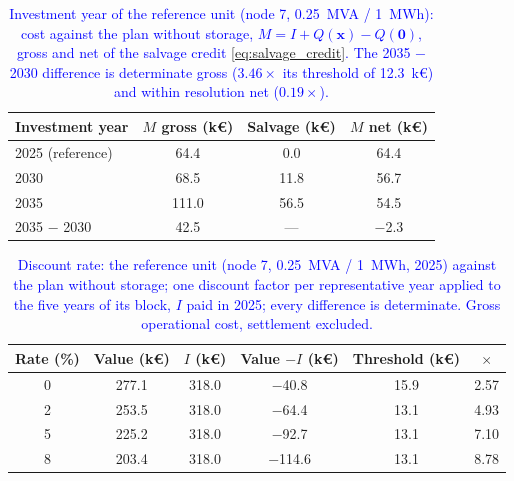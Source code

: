 \begin{table}[htbp!]
    \centering
    \caption{\textcolor{blue}{Investment year of the reference unit (node 7, 0.25~MVA / 1~MWh): cost against the plan without storage, $M = I + Q(\boldsymbol{x}) - Q(\boldsymbol{0})$, gross and net of the salvage credit \eqref{eq:salvage_credit}. The 2035 $-$ 2030 difference is determinate gross ($3.46\times$ its threshold of 12.3~k\euro) and within resolution net ($0.19\times$).}}
    \label{tab:res_year_ladder}
    \scriptsize\setlength{\tabcolsep}{5pt}
    \begin{tabular}{l c c c}
        \toprule
        Investment year & $M$ gross (k\euro) & Salvage (k\euro) & $M$ net (k\euro) \\
        \midrule
        2025 (reference) & 64.4  & 0.0  & 64.4 \\
        2030             & 68.5  & 11.8 & 56.7 \\
        2035             & 111.0 & 56.5 & 54.5 \\
        2035 $-$ 2030    & 42.5  & ---  & $-$2.3 \\
        \bottomrule
    \end{tabular}
\end{table}

\begin{table}[htbp!]
    \centering
    \caption{\textcolor{blue}{Discount rate: the reference unit (node 7, 0.25~MVA / 1~MWh, 2025) against the plan without storage; one discount factor per representative year applied to the five years of its block, $I$ paid in 2025; every difference is determinate. Gross operational cost, settlement excluded.}}
    \label{tab:res_discount}
    \scriptsize\setlength{\tabcolsep}{5pt}
    \begin{tabular}{c c c c c c}
        \toprule
        Rate (\%) & Value (k\euro) & $I$ (k\euro) & Value $- I$ (k\euro) & Threshold (k\euro) & $\times$ \\
        \midrule
        0 & 277.1 & 318.0 & $-$40.8  & 15.9 & 2.57 \\
        2 & 253.5 & 318.0 & $-$64.4  & 13.1 & 4.93 \\
        5 & 225.2 & 318.0 & $-$92.7  & 13.1 & 7.10 \\
        8 & 203.4 & 318.0 & $-$114.6 & 13.1 & 8.78 \\
        \bottomrule
    \end{tabular}
\end{table}
